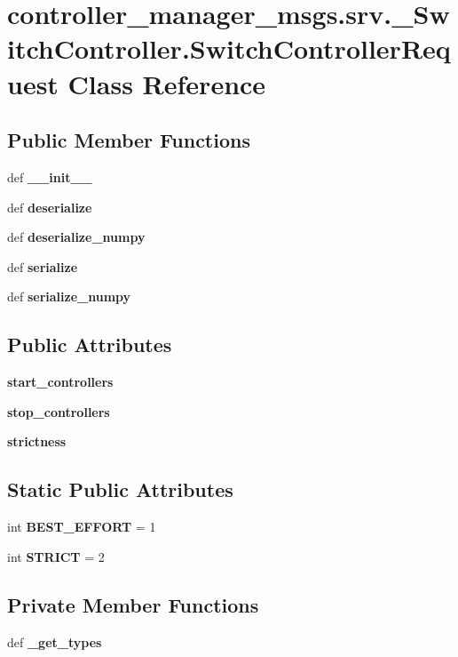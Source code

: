 \section{controller\-\_\-manager\-\_\-msgs.\-srv.\-\_\-\-Switch\-Controller.\-Switch\-Controller\-Request \-Class \-Reference}
\label{classcontroller__manager__msgs_1_1srv_1_1__SwitchController_1_1SwitchControllerRequest}
\subsection*{\-Public \-Member \-Functions}
\begin{DoxyCompactItemize}
\item 
def {\bf \-\_\-\-\_\-init\-\_\-\-\_\-}
\item 
def {\bf deserialize}
\item 
def {\bf deserialize\-\_\-numpy}
\item 
def {\bf serialize}
\item 
def {\bf serialize\-\_\-numpy}
\end{DoxyCompactItemize}
\subsection*{\-Public \-Attributes}
\begin{DoxyCompactItemize}
\item 
{\bf start\-\_\-controllers}
\item 
{\bf stop\-\_\-controllers}
\item 
{\bf strictness}
\end{DoxyCompactItemize}
\subsection*{\-Static \-Public \-Attributes}
\begin{DoxyCompactItemize}
\item 
int {\bf \-B\-E\-S\-T\-\_\-\-E\-F\-F\-O\-R\-T} = 1
\item 
int {\bf \-S\-T\-R\-I\-C\-T} = 2
\end{DoxyCompactItemize}
\subsection*{\-Private \-Member \-Functions}
\begin{DoxyCompactItemize}
\item 
def {\bf \-\_\-get\-\_\-types}
\end{DoxyCompactItemize}
